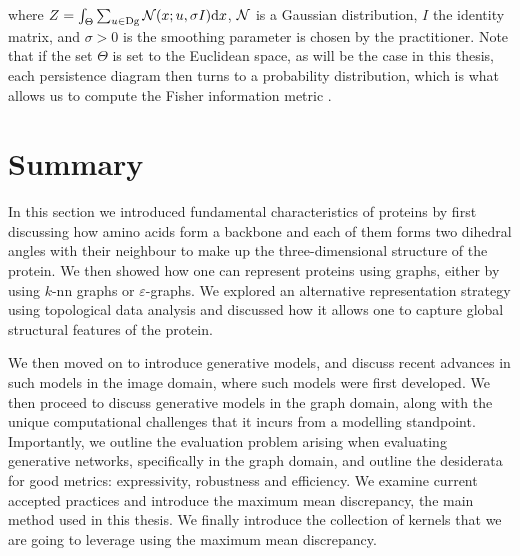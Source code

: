 where $Z=\int_{\Theta}\sum_{u\in\textnormal{Dg}}\mathcal{N}(x;u,\sigma I) \mathrm{d} x$, $\mathcal{N}$ is a
Gaussian distribution, $I$ the identity matrix, and $\sigma>0$ is the smoothing
parameter is chosen by the practitioner. Note that if the set $\Theta$ is set to
the Euclidean space, as will be the case in this thesis, each persistence
diagram then turns to a probability distribution, which is what allows us to
compute the Fisher information metric
\citep{anirudh2016riemannian,adams2017persistence}.

\section{Summary}

In this section we introduced fundamental characteristics of proteins by
first discussing how amino acids form a backbone and each of them forms two dihedral
angles with their neighbour to make up the three-dimensional structure of the
protein. We then showed how one can represent proteins using graphs, either by
using $k$-nn graphs or $\varepsilon$-graphs. We explored an alternative
representation strategy using topological data analysis and discussed how it
allows one to capture global structural features of the protein.

We then moved on to introduce generative models, and discuss recent advances in
such models in the image domain, where such models were first developed. We then
proceed to discuss generative models in the graph domain, along with the unique
computational challenges that it incurs from a modelling standpoint.
Importantly, we outline the evaluation problem arising when evaluating
generative networks, specifically in the graph domain, and outline the
desiderata for good metrics: expressivity, robustness and efficiency. We examine
current accepted practices and introduce the maximum mean discrepancy, the main
method used in this thesis. We finally introduce the collection of kernels that
we are going to leverage using the maximum mean discrepancy.
